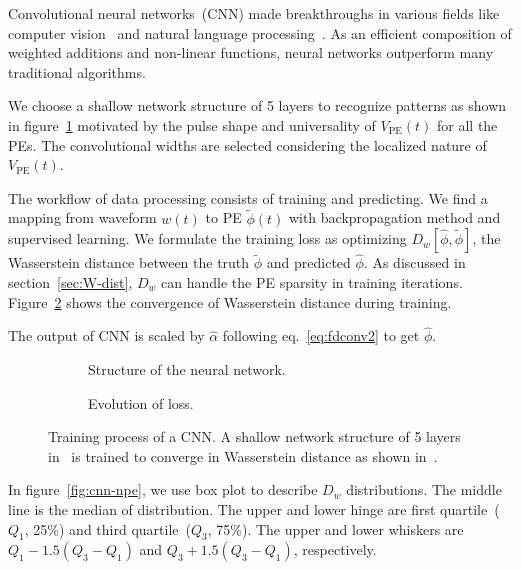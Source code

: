 Convolutional neural networks~(CNN) made breakthroughs in various fields like computer vision~\cite{he_deep_2016} and natural language processing~\cite{vaswani_attention_2017}. As an efficient composition of weighted additions and non-linear functions, neural networks outperform many traditional algorithms.

We choose a shallow network structure of 5 layers to recognize patterns as shown in figure~\ref{fig:struct} motivated by the pulse shape and universality of $V_\mathrm{PE}(t)$ for all the PEs.  The convolutional widths are selected considering the localized nature of $V_\mathrm{PE}(t)$.

The workflow of data processing consists of training and predicting. We find a mapping from waveform $w(t)$ to PE $\tilde{\phi}(t)$ with backpropagation method and supervised learning. We formulate the training loss as optimizing $D_w\left[\hat{\phi}, \tilde{\phi}\right] $, the Wasserstein distance between the truth $\tilde{\phi}$ and predicted $\hat{\phi}$. As discussed in section~\ref{sec:W-dist}, $D_w$ can handle the PE sparsity in training iterations. Figure~\ref{fig:loss} shows the convergence of Wasserstein distance during training.

The output of CNN is scaled by $\hat{\alpha}$ following eq.~\eqref{eq:fdconv2} to get $\hat{\phi}$.

\begin{figure}[H]
  \begin{subfigure}{.4\textwidth}
    \centering
    \begin{adjustbox}{width=0.5\textwidth}
      
    \end{adjustbox}
    \caption{\label{fig:struct} Structure of the neural network.}
  \end{subfigure}
  \begin{subfigure}{.5\textwidth}
    \centering
    \resizebox{\textwidth}{!}{}
    \caption{\label{fig:loss} Evolution of loss.}
  \end{subfigure}
  \caption{\label{fig:CNN} Training process of a CNN. A shallow network structure of 5 layers in~ is trained to converge in Wasserstein distance as shown in~.}
\end{figure}

\vspace{-0.5cm}
In figure~\ref{fig:cnn-npe}, we use box plot to describe $D_w$ distributions. The middle line is the median of distribution. The upper and lower hinge are first quartile~($Q_1$, 25$\%$) and third quartile~($Q_3$, 75$\%$). The upper and lower whiskers are $Q_1-1.5(Q_3-Q_1)$ and $Q_3+1.5(Q_3-Q_1)$, respectively.  %

